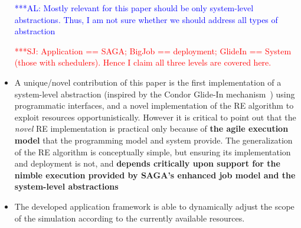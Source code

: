 \documentclass{rspublic}
\newcommand{\alnote}[1]{ {\textcolor{blue} { ***AL: #1 }}}
\newcommand{\jhanote}[1]{ {\textcolor{red} { ***SJ: #1 }}}
\newcommand{\alnote}[1]{}
\newcommand{\jhanote}[1]{}
\begin{document}
\begin{itemize}
    \alnote{Mostly relevant for this paper should be only system-level
      abstractions. Thus, I am not sure whether we should address all
      types of abstraction}

   \jhanote{Application == SAGA; BigJob == deployment; GlideIn ==
      System (those with schedulers). Hence I claim all three levels
      are covered here.}

  \item A unique/novel contribution of this paper is the first
    implementation of a system-level abstraction (inspired by the
    Condor Glide-In mechanism~\citep{citeulike:291860}) using
    programmatic interfaces, and a novel implementation of the
    RE algorithm to exploit resources opportunistically.
    However it is critical to point out that the {\it novel} RE
    implementation is practical only because of {\bf the agile
      execution model} that the programming model and system provide.
    The generalization of the RE algorithm is conceptually simple, but
    ensuring its implementation and deployment is not, and {\bf
      depends critically upon support for the nimble execution
      provided by SAGA's enhanced job model and the system-level
      abstractions}

  \item The developed application framework is able to dynamically
    adjust the scope of the simulation according to the currently
    available resources.

\end{itemize}
\fi
\end{document}
